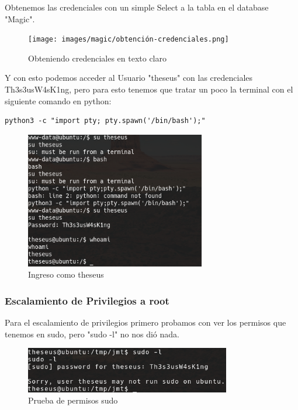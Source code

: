 \documentclass{article}
\begin{document}
\clearpage

Obtenemos las credenciales con un simple Select a la tabla en el database "Magic".
\begin{figure}[h!]
	\center 
	\texttt{[image: images/magic/obtención-credenciales.png]}
	\caption{Obteniendo credenciales en texto claro}
\end{figure}

Y con esto podemos acceder al Usuario "theseus" con las credenciales Th3s3usW4sK1ng, pero para esto tenemos que tratar un poco la terminal con el siguiente comando en python:
\begin{lstlisting}
python3 -c "import pty; pty.spawn('/bin/bash');"
\end{lstlisting}

\begin{figure}[h!]
	\center 
	\includegraphics[width=0.7\textwidth]{images/magic/ingreso-existoso.png}
	\caption{Ingreso como theseus}
\end{figure}

\clearpage

\subsubsection{Escalamiento de Privilegios a root}

Para el escalamiento de privilegios primero probamos con ver los permisos que tenemos en sudo, pero "sudo -l" no nos dió nada.

\begin{figure}[h!]
	\center 
	\includegraphics[width=0.8\textwidth]{images/magic/prueba-sudo-l.png}
	\caption{Prueba de permisos sudo}
\end{figure}
\end{document}
